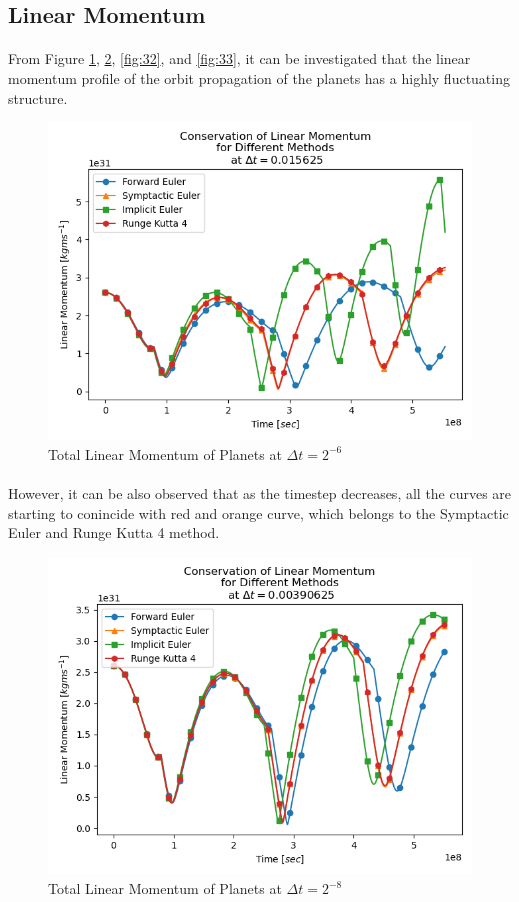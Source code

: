 \documentclass[letterpaper,12pt]{article}
\begin{document}
\subsection{Linear Momentum}
\paragraph{}From Figure \ref{fig:30}, \ref{fig:31}, \ref{fig:32}, and \ref{fig:33}, it can be investigated that the linear momentum profile of the orbit propagation of the planets has a highly fluctuating structure.
    \begin{figure}[H]
    \centerline{\includegraphics[width=0.7\linewidth]{figures/30.png}}
    \caption{Total Linear Momentum of Planets at $\Delta t = 2^{-6}$}
    \label{fig:30}
    \end{figure}
\paragraph{} However, it can be also observed that as the timestep decreases, all the curves are starting to conincide with red and orange curve, which belongs to the Symptactic Euler and Runge Kutta 4 method.
    \begin{figure}[H]
    \centerline{\includegraphics[width=0.7\linewidth]{figures/31.png}}
    \caption{Total Linear Momentum of Planets at $\Delta t = 2^{-8}$}
    \label{fig:31}
    \end{figure}
\end{document}
